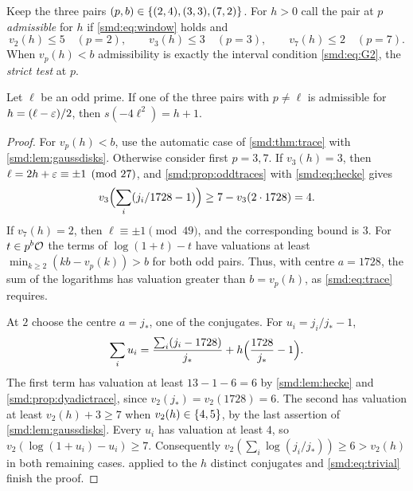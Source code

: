 Keep the three pairs $(p,b)\in\{(2,4),(3,3),(7,2)\}$. For $h>0$
call the pair at $p$ \emph{admissible} for $h$ if \eqref{smd:eq:window} holds and
\begin{equation}\label{smd:eq:allowed}
 v_2(h)\le5\quad(p=2),\qquad v_3(h)\le3\quad(p=3),\qquad v_7(h)\le2\quad(p=7).
\end{equation}
When $v_p(h)<b$ admissibility is exactly the interval condition \eqref{smd:eq:G2}, the
\emph{strict test} at $p$.

\begin{theorem}\label{smd:thm:admissible}
Let $\ell$ be an odd prime. If one of the three pairs with $p\ne\ell$ is admissible for
$h=(\ell-\varepsilon)/2$, then $s(-4\ell^2)=h+1$.
\end{theorem}

\begin{proof}
For $v_p(h)<b$, use the automatic case of \cref{smd:thm:trace} with
\cref{smd:lem:gaussdisks}. Otherwise consider first $p=3,7$. If $v_3(h)=3$, then
$\ell=2h+\varepsilon\equiv\pm1\pmod{27}$, and \cref{smd:prop:oddtraces} with \eqref{smd:eq:hecke}
gives
\[
 v_3\Bigl(\sum_i(j_i/1728-1)\Bigr)\ge7-v_3(2\cdot1728)=4 .
\]
If $v_7(h)=2$, then $\ell\equiv\pm1\pmod{49}$, and the corresponding bound is $3$. For
$t\in p^b\mathcal{O}$ the terms of $\log(1+t)-t$ have valuations at least
$\min_{k\ge2}(kb-v_p(k))>b$ for both odd pairs. Thus, with centre $a=1728$, the sum of the
logarithms has valuation greater than $b=v_p(h)$, as \eqref{smd:eq:trace} requires.

At $2$ choose the centre $a=j_*$, one of the conjugates. For $u_i=j_i/j_*-1$,
\[
 \sum_iu_i=\frac{\sum_i(j_i-1728)}{j_*}+h\Bigl(\frac{1728}{j_*}-1\Bigr).
\]
The first term has valuation at least $13-1-6=6$ by \cref{smd:lem:hecke} and
\cref{smd:prop:dyadictrace}, since $v_2(j_*)=v_2(1728)=6$. The second has valuation at
least $v_2(h)+3\ge7$ when $v_2(h)\in\{4,5\}$, by the last assertion of
\cref{smd:lem:gaussdisks}. Every $u_i$ has valuation at least $4$, so
$v_2(\log(1+u_i)-u_i)\ge7$. Consequently $v_2(\sum_i\log(j_i/j_*))\ge6>v_2(h)$ in both
remaining cases.  applied to the $h$ distinct conjugates and
\eqref{smd:eq:trivial} finish the proof.
\end{proof}


